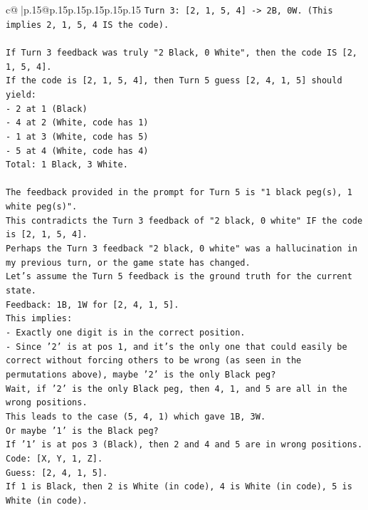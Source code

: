 \documentclass{article}
\begin{document}
{\begin{supertabular}{c@{$\;$}|p{.15\linewidth}@{}p{.15\linewidth}p{.15\linewidth}p{.15\linewidth}p{.15\linewidth}p{.15\linewidth}}
{{{\texttt{Turn 3: {[}2, 1, 5, 4{]} {-}> 2B, 0W. (This implies 2, 1, 5, 4 IS the code).} \\
\\ 
\texttt{If Turn 3 feedback was truly "2 Black, 0 White", then the code IS {[}2, 1, 5, 4{]}.} \\
\texttt{If the code is {[}2, 1, 5, 4{]}, then Turn 5 guess {[}2, 4, 1, 5{]} should yield:} \\
\texttt{{-} 2 at 1 (Black)} \\
\texttt{{-} 4 at 2 (White, code has 1)} \\
\texttt{{-} 1 at 3 (White, code has 5)} \\
\texttt{{-} 5 at 4 (White, code has 4)} \\
\texttt{Total: 1 Black, 3 White.} \\
\\ 
\texttt{The feedback provided in the prompt for Turn 5 is "1 black peg(s), 1 white peg(s)".} \\
\texttt{This contradicts the Turn 3 feedback of "2 black, 0 white" IF the code is {[}2, 1, 5, 4{]}.} \\
\texttt{Perhaps the Turn 3 feedback "2 black, 0 white" was a hallucination in my previous turn, or the game state has changed.} \\
\texttt{Let's assume the Turn 5 feedback is the ground truth for the current state.} \\
\texttt{Feedback: 1B, 1W for {[}2, 4, 1, 5{]}.} \\
\texttt{This implies:} \\
\texttt{{-} Exactly one digit is in the correct position.} \\
\texttt{{-} Since '2' is at pos 1, and it's the only one that could easily be correct without forcing others to be wrong (as seen in the permutations above), maybe '2' is the only Black peg?} \\
\texttt{Wait, if '2' is the only Black peg, then 4, 1, and 5 are all in the wrong positions.} \\
\texttt{This leads to the case (5, 4, 1) which gave 1B, 3W.} \\
\texttt{Or maybe '1' is the Black peg?} \\
\texttt{If '1' is at pos 3 (Black), then 2 and 4 and 5 are in wrong positions.} \\
\texttt{Code: {[}X, Y, 1, Z{]}.} \\
\texttt{Guess: {[}2, 4, 1, 5{]}.} \\
\texttt{If 1 is Black, then 2 is White (in code), 4 is White (in code), 5 is White (in code).} \\
}}}
\end{supertabular}}
\end{document}
